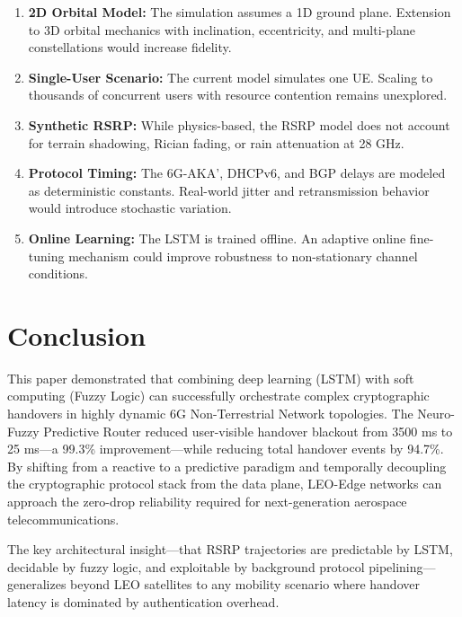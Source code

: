 \documentclass[conference]{IEEEtran}
\begin{document}
\begin{enumerate}
    \item \textbf{2D Orbital Model:} The simulation assumes a 1D ground plane. Extension to 3D orbital mechanics with inclination, eccentricity, and multi-plane constellations would increase fidelity.
    \item \textbf{Single-User Scenario:} The current model simulates one UE. Scaling to thousands of concurrent users with resource contention remains unexplored.
    \item \textbf{Synthetic RSRP:} While physics-based, the RSRP model does not account for terrain shadowing, Rician fading, or rain attenuation at 28 GHz.
    \item \textbf{Protocol Timing:} The 6G-AKA', DHCPv6, and BGP delays are modeled as deterministic constants. Real-world jitter and retransmission behavior would introduce stochastic variation.
    \item \textbf{Online Learning:} The LSTM is trained offline. An adaptive online fine-tuning mechanism could improve robustness to non-stationary channel conditions.
\end{enumerate}

\section{Conclusion}

This paper demonstrated that combining deep learning (LSTM) with soft computing (Fuzzy Logic) can successfully orchestrate complex cryptographic handovers in highly dynamic 6G Non-Terrestrial Network topologies. The Neuro-Fuzzy Predictive Router reduced user-visible handover blackout from 3500 ms to 25 ms---a 99.3\% improvement---while reducing total handover events by 94.7\%. By shifting from a reactive to a predictive paradigm and temporally decoupling the cryptographic protocol stack from the data plane, LEO-Edge networks can approach the zero-drop reliability required for next-generation aerospace telecommunications.

The key architectural insight---that RSRP trajectories are predictable by LSTM, decidable by fuzzy logic, and exploitable by background protocol pipelining---generalizes beyond LEO satellites to any mobility scenario where handover latency is dominated by authentication overhead.
\end{document}
